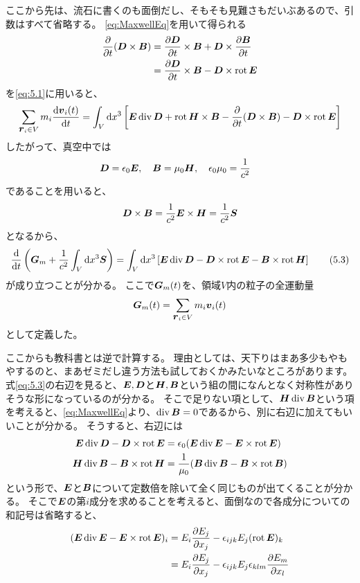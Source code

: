 \documentclass[a4paper]{jsarticle}
\def\vec#1{\mbox{\boldmath $#1$}}
\newcommand{\dif}[2]{\frac{{\rm d} #1}{{\rm d} #2}}
\newcommand{\pdif}[2]{\frac{\partial #1}{\partial #2}}
\newcommand{\ddif}{{\rm d}}
\DeclareMathOperator{\Div}{div}
\DeclareMathOperator{\Rot}{rot}
\begin{document}
ここから先は、流石に書くのも面倒だし、そもそも見難さもだいぶあるので、引数はすべて省略する。
\eqref{eq:MaxwellEq}を用いて得られる
\begin{align}
	\pdif{}{t} ( \vec{D} \times \vec{B})
	&= \pdif{\vec{D}}{t} \times \vec{B} + \vec{D} \times \pdif{\vec{B}}{t} \\
	&= \pdif{\vec{D}}{t} \times \vec{B} - \vec{D} \times \Rot \vec{E}
\end{align}
を\eqref{eq:5.1}に用いると、
\begin{align}
	\sum_{\vec{r}_i \in V} m_i \dif{\vec{v}_i(t)}{t}
	= \int_V \ddif x^3 \left[
		\vec{E} \Div \vec{D} + \Rot \vec{H} \times \vec{B}
		- \pdif{}{t} (\vec{D} \times \vec{B}) - \vec{D} \times \Rot \vec{E}
	\right]
\end{align}
したがって、真空中では
\begin{align}
	&\vec{D} = \epsilon_0 \vec{E}, \quad \vec{B} = \mu_0 \vec{H}, \quad
	\epsilon_0 \mu_0 = \frac{1}{c^2} \label{eq:vacuum}
\end{align}
であることを用いると、
\begin{align}
	\vec{D} \times \vec{B} = \frac{1}{c^2} \vec{E} \times \vec{H}
	= \frac{1}{c^2} \vec{S}
\end{align}
となるから、
\begin{align}
	\dif{}{t} \left( \vec{G}_m + \frac{1}{c^2} \int_V \ddif x^3 \vec{S} \right)
	= \int_V \ddif x^3 \left[
		\vec{E} \Div \vec{D} - \vec{D} \times \Rot \vec{E}
		- \vec{B} \times \Rot \vec{H}
	\right] \tag{5.3} \label{eq:5.3}
\end{align}
が成り立つことが分かる。
ここで$\vec{G}_m(t)$を、領域$V$内の粒子の全運動量
\begin{align}
	\vec{G}_m(t) = \sum_{\vec{r}_i \in V} m_i \vec{v}_i(t)
\end{align}
として定義した。

ここからも教科書とは逆で計算する。
理由としては、天下りはまあ多少もやもやするのと、まあゼミだし違う方法も試しておくかみたいなところがあります。
式\eqref{eq:5.3}の右辺を見ると、$\vec{E}, \vec{D}$と$\vec{H}, \vec{B}$という組の間になんとなく対称性がありそうな形になっているのが分かる。
そこで足りない項として、$\vec{H} \Div \vec{B}$という項を考えると、\eqref{eq:MaxwellEq}より、$\Div \vec{B} = 0$であるから、別に右辺に加えてもいいことが分かる。
そうすると、右辺には
\begin{align}
	\vec{E} \Div \vec{D} - \vec{D} \times \Rot \vec{E} 
	&= \epsilon_0 (\vec{E} \Div \vec{E} - \vec{E} \times \Rot \vec{E}) \\
	\vec{H} \Div \vec{B} - \vec{B} \times \Rot \vec{H}
	&= \frac{1}{\mu_0} (\vec{B} \Div \vec{B} - \vec{B} \times \Rot \vec{B})
\end{align}
という形で、$\vec{E}$と$\vec{B}$について定数倍を除いて全く同じものが出てくることが分かる。
そこで$\vec{E}$の第$i$成分を求めることを考えると、面倒なので各成分についての和記号は省略すると、
\begin{align}
	(\vec{E} \Div \vec{E} - \vec{E} \times \Rot \vec{E})_i
	&= E_i \pdif{E_j}{x_j} - \epsilon_{ijk} E_j (\Rot \vec{E})_k \\
	&= E_i \pdif{E_j}{x_j} - \epsilon_{ijk} E_j \epsilon_{klm} \pdif{E_m}{x_l}
\end{align}
\end{document}
